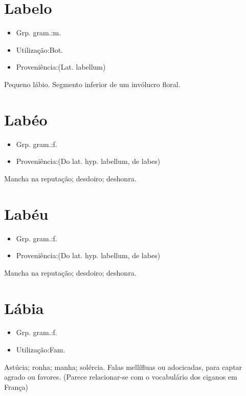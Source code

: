\section{Labelo}
\begin{itemize}
\item {Grp. gram.:m.}
\end{itemize}
\begin{itemize}
\item {Utilização:Bot.}
\end{itemize}
\begin{itemize}
\item {Proveniência:(Lat. \textunderscore labellum\textunderscore )}
\end{itemize}
Pequeno lábio.
Segmento inferior de um invólucro floral.
\section{Labéo}
\begin{itemize}
\item {Grp. gram.:f.}
\end{itemize}
\begin{itemize}
\item {Proveniência:(Do lat. hyp. \textunderscore labellum\textunderscore , de \textunderscore labes\textunderscore )}
\end{itemize}
Mancha na reputação; desdoiro; deshonra.
\section{Labéu}
\begin{itemize}
\item {Grp. gram.:f.}
\end{itemize}
\begin{itemize}
\item {Proveniência:(Do lat. hyp. \textunderscore labellum\textunderscore , de \textunderscore labes\textunderscore )}
\end{itemize}
Mancha na reputação; desdoiro; deshonra.
\section{Lábia}
\begin{itemize}
\item {Grp. gram.:f.}
\end{itemize}
\begin{itemize}
\item {Utilização:Fam.}
\end{itemize}
Astúcia; ronha; manha; solércia.
Falas mellífluas ou adocicadas, para captar agrado ou favores.
(Parece relacionar-se com o vocabulário dos ciganos em França)
